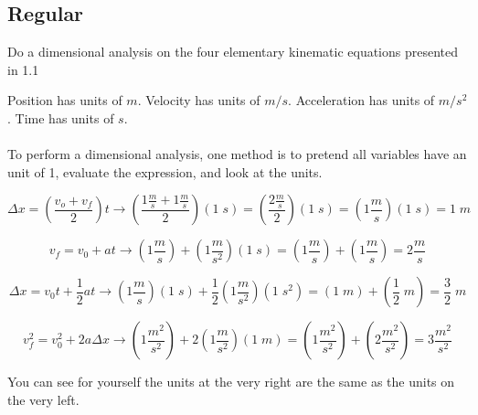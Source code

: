 

\subsection*{Regular}

\begin{question}
Do a dimensional analysis on the four elementary kinematic equations presented in 1.1
\end{question}

\begin{solution}
Position has units of $m$. Velocity has units of $m/s$. Acceleration has units of $m/s^2$. Time has units of $s$.
\\\\
To perform a dimensional analysis, one method is to pretend all variables have an unit of 1, evaluate the expression, and look at the units.

\begin{equation*}
\Delta x = (\frac{v_o + v_f}{2})t \rightarrow 
(\frac{1 \frac{m}{s} + 1 \frac{m}{s}}{2})(1\;s) =
(\frac{2 \frac{m}{s}}{2})(1\;s) = 
(1 \frac{m}{s})(1\;s) = 
1\;m
\end{equation*}

\begin{equation*}
v_f = v_0 + at \rightarrow 
(1\frac{m}{s}) + (1\frac{m}{s^2})(1\;s) =
(1\frac{m}{s}) + (1\frac{m}{s}) =
2\frac{m}{s}
\end{equation*}

\begin{equation*}
\Delta x = v_0t + \frac{1}{2}at \rightarrow 
(1\frac{m}{s})(1\;s) + \frac{1}{2}(1\frac{m}{s^2})(1\;s^2) =
(1\;m) + (\frac{1}{2}\;m) =
\frac{3}{2}\;m
\end{equation*}

\begin{equation*}
v_f^2 = v_0^2 + 2a\Delta x \rightarrow 
(1\frac{m^2}{s^2}) + 2(1\frac{m}{s^2})(1\;m) =
(1\frac{m^2}{s^2}) + (2\frac{m^2}{s^2}) =
3\frac{m^2}{s^2}
\end{equation*}

You can see for yourself the units at the very right are the same as the units on the very left.
\end{solution}

